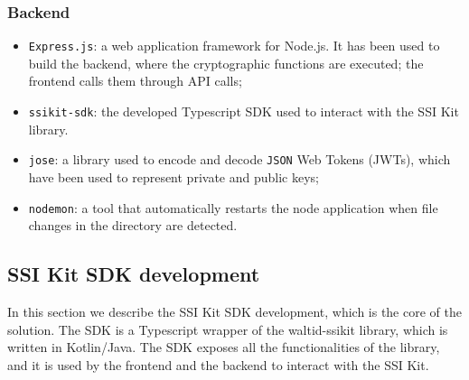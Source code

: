 \subsubsection{Backend}
\begin{itemize}
    \setlength\itemsep{-0.1em}
    \item \texttt{Express.js}: a web application framework for Node.js. It has been
    used to build the backend, where the cryptographic functions are executed; the frontend
    calls them through API calls;
    \item \texttt{ssikit-sdk}: the developed Typescript SDK used to interact with
    the SSI Kit library.
    \item \texttt{jose}: a library used to encode and decode \texttt{JSON} Web Tokens (JWTs),
    which have been used to represent private and public keys;
    \item \texttt{nodemon}: a tool that automatically restarts the node application
    when file changes in the directory are detected.
\end{itemize}

\subsection{SSI Kit SDK development}
In this section we describe the SSI Kit SDK development, which is the core of the
solution. The SDK is a Typescript wrapper of the waltid-ssikit library, which is
written in Kotlin/Java. The SDK exposes all the functionalities of the library,
and it is used by the frontend and the backend to interact with the SSI Kit.

